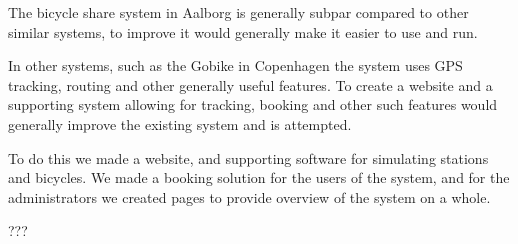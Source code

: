The bicycle share system in Aalborg is generally subpar compared to other similar systems, to improve it would generally make it easier to use and run.

In other systems, such as the Gobike in Copenhagen the system uses GPS tracking, routing and other generally useful features. 
To create a website and a supporting system allowing for tracking, booking and other such features would generally improve the existing system and is attempted.

To do this we made a website, and supporting software for simulating stations and bicycles. We made a booking solution for the users of the system, and for the administrators we created pages to provide overview of the system on a whole.

???
